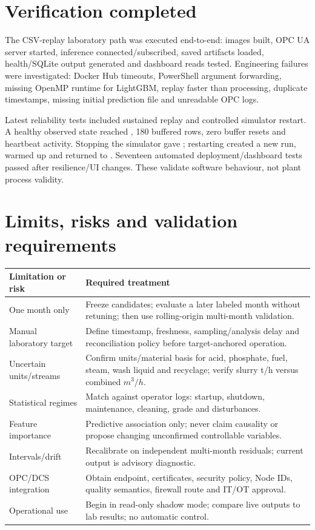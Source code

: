 \documentclass[10pt,a4paper]{article}
\begin{document}
\section{Verification completed}
The CSV-replay laboratory path was executed end-to-end: images built, OPC UA server started, inference connected/subscribed, saved artifacts loaded, health/SQLite output generated and dashboard reads tested. Engineering failures were investigated: Docker Hub timeouts, PowerShell argument forwarding, missing OpenMP runtime for LightGBM, replay faster than processing, duplicate timestamps, missing initial prediction file and unreadable OPC logs.

Latest reliability tests included sustained replay and controlled simulator restart. A healthy observed state reached , 180 buffered rows, zero buffer resets and heartbeat activity. Stopping the simulator gave ; restarting created a new run, warmed up and returned to . Seventeen automated deployment/dashboard tests passed after resilience/UI changes. These validate software behaviour, not plant process validity.

\section{Limits, risks and validation requirements}
\begin{table}[H]\centering\begin{tabularx}{\textwidth}{L{0.30\textwidth}Y}\toprule \textbf{Limitation or risk} & \textbf{Required treatment}\\\midrule
One month only & Freeze candidates; evaluate a later labeled month without retuning; then use rolling-origin multi-month validation.\\
Manual laboratory target & Define timestamp, freshness, sampling/analysis delay and reconciliation policy before target-anchored operation.\\
Uncertain units/streams & Confirm units/material basis for acid, phosphate, fuel, steam, wash liquid and recyclage; verify slurry t/h versus combined $m^3/h$.\\
Statistical regimes & Match against operator logs: startup, shutdown, maintenance, cleaning, grade and disturbances.\\
Feature importance & Predictive association only; never claim causality or propose changing unconfirmed controllable variables.\\
Intervals/drift & Recalibrate on independent multi-month residuals; current output is advisory diagnostic.\\
OPC/DCS integration & Obtain endpoint, certificates, security policy, Node IDs, quality semantics, firewall route and IT/OT approval.\\
Operational use & Begin in read-only shadow mode; compare live outputs to lab results; no automatic control.\\\bottomrule\end{tabularx}\end{table}
\end{document}
